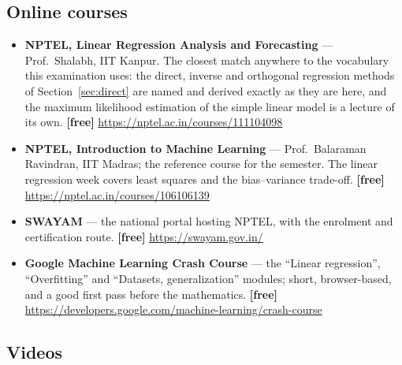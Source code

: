 \documentclass[11pt]{article}
\begin{document}
\subsection*{Online courses}

\begin{sloppypar}
\begin{itemize}[leftmargin=*]
  \item \textbf{NPTEL, Linear Regression Analysis and Forecasting} --- Prof.\
    Shalabh, IIT Kanpur. The closest match anywhere to the vocabulary this
    examination uses: the direct, inverse and orthogonal regression methods of
    Section~\ref{sec:direct} are named and derived exactly as they are here,
    and the maximum likelihood estimation of the simple linear model is a
    lecture of its own. \textbf{[free]}
    \url{https://nptel.ac.in/courses/111104098}
  \item \textbf{NPTEL, Introduction to Machine Learning} --- Prof.\ Balaraman
    Ravindran, IIT Madras; the reference course for the semester. The linear
    regression week covers least squares and the bias--variance trade-off.
    \textbf{[free]} \url{https://nptel.ac.in/courses/106106139}
  \item \textbf{SWAYAM} --- the national portal hosting NPTEL, with the
    enrolment and certification route. \textbf{[free]}
    \url{https://swayam.gov.in/}
  \item \textbf{Google Machine Learning Crash Course} --- the ``Linear
    regression'', ``Overfitting'' and ``Datasets, generalization'' modules;
    short, browser-based, and a good first pass before the mathematics.
    \textbf{[free]}
    \url{https://developers.google.com/machine-learning/crash-course}
\end{itemize}
\end{sloppypar}

\subsection*{Videos}
\end{document}
